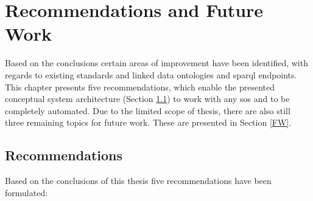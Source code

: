 
\chapter{Recommendations and Future Work}
\label{chap:futureResearch}
Based on the conclusions certain areas of improvement have been identified, with regards to existing standards and linked data ontologies and \ac{sparql} endpoints. This chapter presents five recommendations, which enable the presented conceptual system architecture (Section \ref{recommend}) to work with any \ac{sos} and to be completely automated. Due to the limited scope of thesis, there are also still three remaining topics for future work. These are presented in Section \ref{FW}.

\section{Recommendations}
\label{recommend}
Based on the conclusions of this thesis five recommendations have been formulated: 


